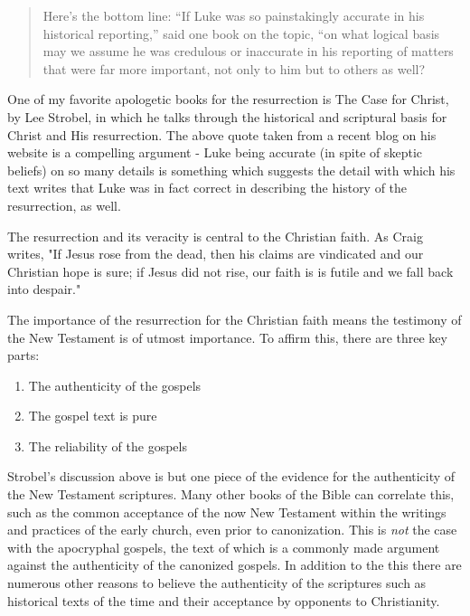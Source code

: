 \documentclass[12pt]{turabian-researchpaper}
\begin{document}
\begin{quotation}
\noindent Here’s the bottom line: “If Luke was so painstakingly accurate in his historical reporting,” said one book on the topic, “on what logical basis may we assume he was credulous or inaccurate in his reporting of matters that were far more important, not only to him but to others as well?\autocite{strobel2017}

\end{quotation}
One of my favorite apologetic books for the resurrection is The Case for Christ, by Lee Strobel, in which he talks through the historical and scriptural basis for Christ and His resurrection.\autocite{church2009case} The above quote taken from a recent blog on his website is a compelling argument - Luke being accurate (in spite of skeptic beliefs) on so many details is something which suggests the detail with which his text writes that Luke was in fact correct in describing the history of the resurrection, as well.

The resurrection and its veracity is central to the Christian faith. As Craig writes, "If Jesus rose from the dead, then his claims are vindicated and our Christian hope is sure; if Jesus did not rise, our faith is is futile and we fall back into despair."\autocite[pg.333]{craig2008reasonable} 

The importance of the resurrection for the Christian faith means the testimony of the New Testament is of utmost importance. To affirm this, there are three key parts\autocite[pg.336]{craig2008reasonable}:

\begin{enumerate}
\item The authenticity of the gospels
\item The gospel text is pure
\item The reliability of the gospels
\end{enumerate} 

Strobel's discussion above is but one piece of the evidence for the authenticity of the New Testament scriptures. Many other books of the Bible can correlate this, such as the common acceptance of the now New Testament within the writings and practices of the early church, even prior to canonization. This is \textit{not} the case with the apocryphal gospels, the text of which is a commonly made argument against the authenticity of the canonized gospels. In addition to the this there are numerous other reasons to believe the authenticity of the scriptures such as historical texts of the time and their acceptance by opponents to Christianity.
\end{document}
